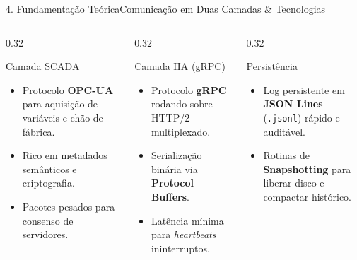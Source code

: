 \documentclass[aspectratio=169,10pt]{beamer}
\begin{document}
\begin{frame}{4. Fundamentação Teórica}{Comunicação em Duas Camadas \& Tecnologias}
  \begin{columns}[t]
    \begin{column}{0.32\textwidth}
      \begin{block}{Camada SCADA}
        \begin{itemize}
          \item Protocolo \textbf{OPC-UA} para aquisição de variáveis e chão de fábrica.
          \item Rico em metadados semânticos e criptografia.
          \item Pacotes pesados para consenso de servidores.
        \end{itemize}
      \end{block}
    \end{column}
    \begin{column}{0.32\textwidth}
      \begin{block}{Camada HA (gRPC)}
        \begin{itemize}
          \item Protocolo \textbf{gRPC} rodando sobre HTTP/2 multiplexado.
          \item Serialização binária via \textbf{Protocol Buffers}.
          \item Latência mínima para \textit{heartbeats} ininterruptos.
        \end{itemize}
      \end{block}
    \end{column}
    \begin{column}{0.32\textwidth}
      \begin{block}{Persistência}
        \begin{itemize}
          \item Log persistente em \textbf{JSON Lines} (\texttt{.jsonl}) rápido e auditável.
          \item Rotinas de \textbf{Snapshotting} para liberar disco e compactar histórico.
        \end{itemize}
      \end{block}
    \end{column}
  \end{columns}
\end{frame}
\end{document}
